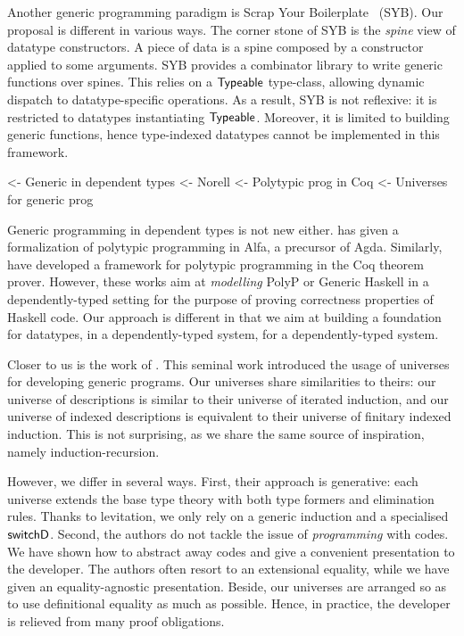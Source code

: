 Another generic programming paradigm is Scrap Your
Boilerplate~\cite{spj:syb} (SYB). Our proposal is different in various
ways. The corner stone of SYB is the \emph{spine} view of datatype
constructors. A piece of data is a spine composed by a constructor
applied to some arguments. SYB provides a combinator library to write
generic functions over spines. This relies on a $\textsf{Typeable}$
type-class, allowing dynamic dispatch to datatype-specific
operations. As a result, SYB is not reflexive: it is restricted to
datatypes instantiating $\textsf{Typeable}$. Moreover, it is limited to
building generic functions, hence type-indexed datatypes cannot be
implemented in this framework.


\begin{wstructure}
    <- Generic in dependent types
        <- Norell \cite{norell:msc-thesis}
        <- Polytypic prog in Coq \cite{verbruggen:polytype-coq}
        <- Universes for generic prog \cite{benke:universe-generic-prog}
\end{wstructure}

Generic programming in dependent types is not new
either. \citet{norell:msc-thesis} has given a formalization of
polytypic programming in Alfa, a precursor of Agda. Similarly,
\citet{verbruggen:polytype-prog-coq, verbruggen:polytype-coq} have
developed a framework for polytypic programming in the Coq theorem
prover. However, these works aim at \emph{modelling} PolyP or Generic
Haskell in a dependently-typed setting for the purpose of proving
correctness properties of Haskell code. Our approach is different in
that we aim at building a foundation for datatypes, in a
dependently-typed system, for a dependently-typed system.

Closer to us is the work of \citet{benke:universe-generic-prog}. This
seminal work introduced the usage of universes for developing generic
programs. Our universes share similarities to theirs: our universe of
descriptions is similar to their universe of iterated induction, and
our universe of indexed descriptions is equivalent to their universe
of finitary indexed induction. This is not surprising, as we share the
same source of inspiration, namely induction-recursion.

However, we differ in several ways. First, their approach is
generative: each universe extends the base type theory with both type
formers and elimination rules. Thanks to levitation, we only rely on a
generic induction and a specialised $\SYMBswitchD$. Second,
the authors do not tackle the issue of \emph{programming} with
codes. We have shown how to abstract away codes and give a convenient
presentation to the developer. The authors often resort to an
extensional equality, while we have given an equality-agnostic
presentation. Beside, our universes are arranged so as to use
definitional equality as much as possible. Hence, in practice, the
developer is relieved from many proof obligations.

